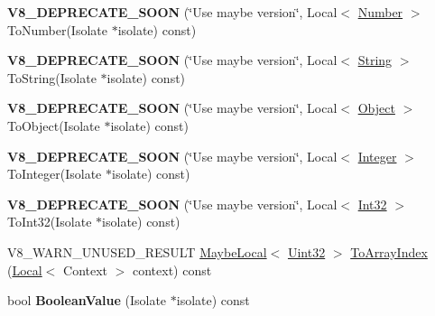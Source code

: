 \begin{DoxyCompactItemize}
\mbox{\label{classv8_1_1Value_a855a0b74584b9c322c04891783f37e9c}} 
{\bfseries V8\+\_\+\+D\+E\+P\+R\+E\+C\+A\+T\+E\+\_\+\+S\+O\+ON} (\char`\"{}Use maybe version\char`\"{}, Local$<$ \mbox{\hyperlink{classv8_1_1Number}{Number}} $>$ To\+Number(Isolate $\ast$isolate) const)
\item 
\mbox{\label{classv8_1_1Value_a898f773c591e760fcb98e99cccff3e5c}} 
{\bfseries V8\+\_\+\+D\+E\+P\+R\+E\+C\+A\+T\+E\+\_\+\+S\+O\+ON} (\char`\"{}Use maybe version\char`\"{}, Local$<$ \mbox{\hyperlink{classv8_1_1String}{String}} $>$ To\+String(Isolate $\ast$isolate) const)
\item 
\mbox{\label{classv8_1_1Value_a4c98939a72d6c48b01c8279cfe218d34}} 
{\bfseries V8\+\_\+\+D\+E\+P\+R\+E\+C\+A\+T\+E\+\_\+\+S\+O\+ON} (\char`\"{}Use maybe version\char`\"{}, Local$<$ \mbox{\hyperlink{classv8_1_1Object}{Object}} $>$ To\+Object(Isolate $\ast$isolate) const)
\item 
\mbox{\label{classv8_1_1Value_aae926c4392edf0ad4a5383ab0d8af4b1}} 
{\bfseries V8\+\_\+\+D\+E\+P\+R\+E\+C\+A\+T\+E\+\_\+\+S\+O\+ON} (\char`\"{}Use maybe version\char`\"{}, Local$<$ \mbox{\hyperlink{classv8_1_1Integer}{Integer}} $>$ To\+Integer(Isolate $\ast$isolate) const)
\item 
\mbox{\label{classv8_1_1Value_abf72660ee84f81fe2fed85e39e6a3c86}} 
{\bfseries V8\+\_\+\+D\+E\+P\+R\+E\+C\+A\+T\+E\+\_\+\+S\+O\+ON} (\char`\"{}Use maybe version\char`\"{}, Local$<$ \mbox{\hyperlink{classv8_1_1Int32}{Int32}} $>$ To\+Int32(Isolate $\ast$isolate) const)
\item 
V8\+\_\+\+W\+A\+R\+N\+\_\+\+U\+N\+U\+S\+E\+D\+\_\+\+R\+E\+S\+U\+LT \mbox{\hyperlink{classv8_1_1MaybeLocal}{Maybe\+Local}}$<$ \mbox{\hyperlink{classv8_1_1Uint32}{Uint32}} $>$ \mbox{\hyperlink{classv8_1_1Value_a3d7597e5cf475e73f127e2591d46bdf4}{To\+Array\+Index}} (\mbox{\hyperlink{classv8_1_1Local}{Local}}$<$ Context $>$ context) const
\item 
\mbox{\label{classv8_1_1Value_a00fb01ca03d847407a2ed9a262035ebc}} 
bool {\bfseries Boolean\+Value} (Isolate $\ast$isolate) const
\item 
\mbox{\label{classv8_1_1Value_af549abfa3ce69b26ce2399ea240990af}} 

\end{DoxyCompactItemize}
